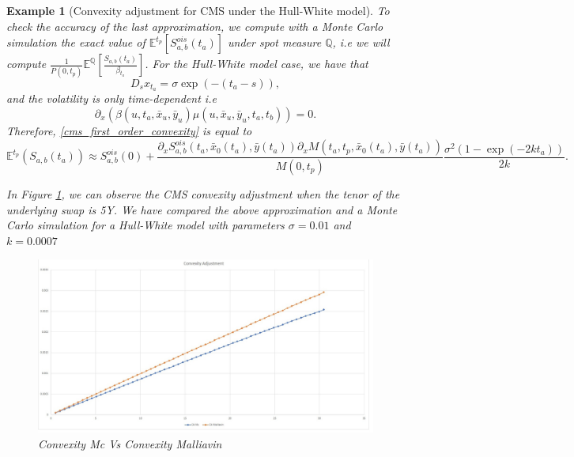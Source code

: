 \documentclass[a4paper,10pt]{article}
\newtheorem{example}[theorem]{Example}
\newcommand{\1}{\mathbf{1}}
\begin{document}
\begin{example}[Convexity adjustment for CMS under the Hull-White model]
To check the accuracy of the last approximation, we compute with a Monte Carlo simulation the exact value of $\mathbb{E}^{t_p}\left[S^{ois}_{a,b}(t_a)\right]$ under spot measure $\mathbb{Q}$, i.e we will compute  $\frac{1}{P(0,t_p)}  \mathbb{E}^{\mathbb{Q}}\left[\frac{S_{a,b}(t_a)}{\beta_{t_a}} \right]$. For the Hull-White model case, we have that
\begin{equation*}
D_s x_{t_a} = \sigma \exp(-(t_a - s)),
\end{equation*}
and the volatility is only time-dependent i.e 
$$
\partial_x (\beta(u,t_a,\bar{x}_u,\bar{y}_u) \mu(u,\bar{x}_u, \bar{y}_u,t_a,t_b)) = 0.
$$
Therefore, \eqref{cms_first_order_convexity} is equal to
\begin{equation*}
\mathbb{E}^{t_p}\left(S_{a,b}(t_a)\right) \approx  S^{ois}_{a,b}(0) + \frac{\partial_x S^{ois}_{a,b}(t_a, \bar{x}_0(t_a),\bar{y}(t_a))\partial_x M(t_a,t_p, \bar{x}_0(t_a),\bar{y}(t_a))}{M(0,t_p)} \frac{\sigma^{2}(1-\exp(-2kt_a))}{2k}.
\end{equation*}

In Figure \ref{fig:CMS}, we can observe the CMS convexity adjustment when the tenor of the underlying swap is 5Y. We have compared the above approximation and a Monte Carlo simulation for a Hull-White model with parameters $\sigma=0.01$ and $k=0.0007$

\begin{figure}[H]
	\begin{center}
		\includegraphics[scale=0.25]{Figures/cms_convexity_order.jpg}
	\end{center}
	\caption{Convexity Mc Vs Convexity Malliavin}
	\label{fig:CMS}
\end{figure} 
\end{example}
\end{document}
